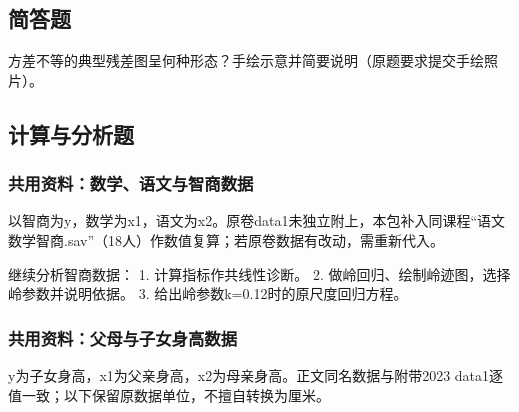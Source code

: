 \subsection{简答题}

\par\addvspace{6pt}\noindent\begin{minipage}{\linewidth}


方差不等的典型残差图呈何种形态？手绘示意并简要说明（原题要求提交手绘照片）。



\end{minipage}\par\vspace{4pt}

\subsection{计算与分析题}

\subsubsection*{共用资料：数学、语文与智商数据}

以智商为y，数学为x1，语文为x2。原卷data1未独立附上，本包补入同课程``语文数学智商.sav''（18人）作数值复算；若原卷数据有改动，需重新代入。


\par\addvspace{6pt}\noindent\begin{minipage}{\linewidth}


继续分析智商数据： 1. 计算指标作共线性诊断。 2. 做岭回归、绘制岭迹图，选择岭参数并说明依据。 3. 给出岭参数k=0.12时的原尺度回归方程。



\end{minipage}\par\vspace{4pt}

\subsubsection*{共用资料：父母与子女身高数据}

y为子女身高，x1为父亲身高，x2为母亲身高。正文同名数据与附带2023 data1逐值一致；以下保留原数据单位，不擅自转换为厘米。

